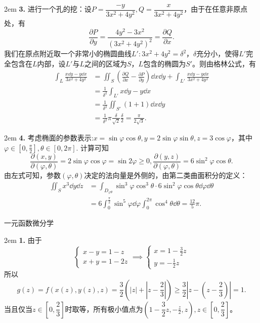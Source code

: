 \documentclass[UTF8,14pt,normal]{ctexart}
\begin{document}
    \hangindent 2em
    \noindent    
    \textbf{3.}
    进行一个孔的挖：设\(P=\dfrac{-y}{3x^2+4y^2},Q=\dfrac{x}{3x^2+4y^2}\)，由于在任意非原点处，有\[\frac{\partial P}{\partial y} = \frac{4y^2-3x^2}{(3x^2+4y^2)^2} = \frac{\partial Q}{\partial x}.\]
    我们在原点附近取一个非常小的椭圆曲线\(L':3x^2+4y^2 = \delta^2\)，\(\delta\)充分小，使得\(L'\)完全包含在\(L\)内部，设\(L'\)与\(L\)之间的区域为\(S\)，\(L\)包含的椭圆为\(S'\)。则由格林公式，有
    \begin{equation*}
        \begin{split}
            \int_{L}\frac{x\dd y-y\dd x}{3x^2+4y^2} &= \iint_{S}\left(\frac{\partial Q}{\partial x}-\frac{\partial P}{\partial y}\right)\dd x\dd y +\int_{L'}\frac{x\dd y-y\dd x}{3x^2+4y^2} \\
            &= \frac{1}{\delta^2}\int_{L'}x\dd y-y\dd x\\
            &= \frac{1}{\delta^2}\iint_{S'}(1+1)\dd x\dd y\\
            &= \frac{1}{\delta^2}\pi\frac{\delta}{\sqrt{2}}\frac{\delta}{2} = \frac{\pi}{2\sqrt{3}}.
        \end{split}
    \end{equation*}

    \hangindent 2em
    \noindent    
    \textbf{4.}
    考虑椭面的参数表示:\(x = \sin\varphi\cos\theta, y = 2\sin\varphi\sin\theta, z = 3\cos\varphi\)，其中\(\varphi\in[0,\frac{\pi}{2}],\theta\in[0,2\pi]\).
    计算可知\[\frac{\partial(x,y)}{\partial(\varphi,\theta)} = 2\sin\varphi\cos\varphi = \sin 2\varphi\geqslant0,\frac{\partial (y,z)}{\partial(\varphi,\theta)} = 6\sin^2\varphi\cos\theta.\]
    由左式可知，参数\((\varphi,\theta)\)决定的法向量是外侧的，由第二类曲面积分的定义：
    \begin{equation*}
        \begin{split}
            \iint_{S}x^3\dd y\dd z &=\int_{D_{\varphi\theta}}\sin^3\varphi\cos^3\theta\cdot 6\sin^2\varphi\cos\theta\dd\varphi\dd\theta\\ 
            &= 6\int_{0}^{\frac{\pi}{2}}\sin^5\varphi\dd\varphi\int_{0}^{2\pi}\cos^4\theta\dd\theta = \frac{12}{5}\pi.
        \end{split}
    \end{equation*}

 一元函数微分学

    \hangindent 2em
    \noindent
    \textbf{1.}
    由于
    \begin{equation*}
        \begin{cases}
            x-y = 1-z\\
            x+y = 1-2z
        \end{cases}
        \implies
        \begin{cases}
            x = 1-\frac{3}{2}z\\
            y = -\frac{1}{2}z
        \end{cases}
    \end{equation*}
    所以\[g(z) = f(x(z),y(z),z) = \dfrac{3}{2}(|z|+|z-\dfrac{2}{3}|)\geqslant\frac{3}{2}|z-(z-\frac{2}{3})| = 1.\]
    当且仅当\(z\in[0,\dfrac{2}{3}]\)时取等，所有极小值点为\((1-\dfrac{3}{2}z,-\frac{z}{2},z),z\in[0,\dfrac{2}{3}]\)。
\end{document}
